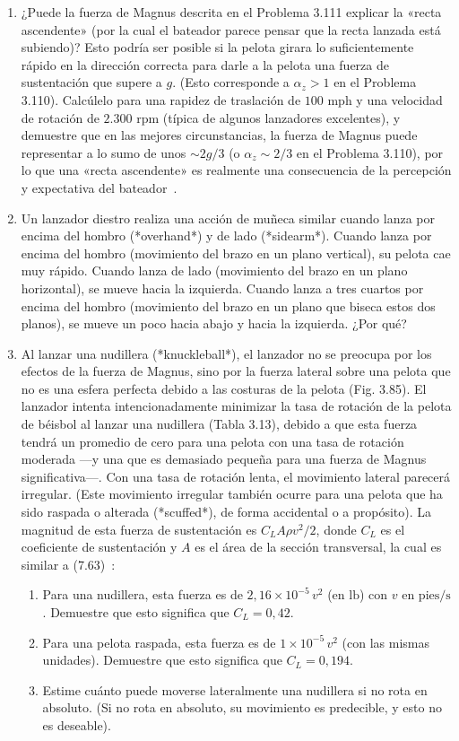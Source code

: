 \documentclass[12pt]{book}
\begin{document}
\begin{enumerate}
\item[3.112] ¿Puede la fuerza de Magnus descrita en el Problema 3.111 explicar la «recta ascendente» (por la cual el bateador parece pensar que la recta lanzada está subiendo)? Esto podría ser posible si la pelota girara lo suficientemente rápido en la dirección correcta para darle a la pelota una fuerza de sustentación que supere a $g$. (Esto corresponde a $\alpha_z > 1$ en el Problema 3.110). Calcúlelo para una rapidez de traslación de $100\text{ mph}$ y una velocidad de rotación de $2.300\text{ rpm}$ (típica de algunos lanzadores excelentes), y demuestre que en las mejores circunstancias, la fuerza de Magnus puede representar a lo sumo de unos $\sim 2g/3$ (o $\alpha_z \sim 2/3$ en el Problema 3.110), por lo que una «recta ascendente» es realmente una consecuencia de la percepción y expectativa del bateador~\cite{ref9,ref137}.

\item[3.113] Un lanzador diestro realiza una acción de muñeca similar cuando lanza por encima del hombro (*overhand*) y de lado (*sidearm*). Cuando lanza por encima del hombro (movimiento del brazo en un plano vertical), su pelota cae muy rápido. Cuando lanza de lado (movimiento del brazo en un plano horizontal), se mueve hacia la izquierda. Cuando lanza a tres cuartos por encima del hombro (movimiento del brazo en un plano que biseca estos dos planos), se mueve un poco hacia abajo y hacia la izquierda. ¿Por qué?

\item[3.114] Al lanzar una nudillera (*knuckleball*), el lanzador no se preocupa por los efectos de la fuerza de Magnus, sino por la fuerza lateral sobre una pelota que no es una esfera perfecta debido a las costuras de la pelota (Fig. 3.85). El lanzador intenta intencionadamente minimizar la tasa de rotación de la pelota de béisbol al lanzar una nudillera (Tabla 3.13), debido a que esta fuerza tendrá un promedio de cero para una pelota con una tasa de rotación moderada ---y una que es demasiado pequeña para una fuerza de Magnus significativa---. Con una tasa de rotación lenta, el movimiento lateral parecerá irregular. (Este movimiento irregular también ocurre para una pelota que ha sido raspada o alterada (*scuffed*), de forma accidental o a propósito). La magnitud de esta fuerza de sustentación es $C_L A \rho v^2 / 2$, donde $C_L$ es el coeficiente de sustentación y $A$ es el área de la sección transversal, la cual es similar a (7.63)~\cite{ref137}:
\begin{enumerate}
\item[(a)] Para una nudillera, esta fuerza es de $2{,}16 \times 10^{-5}\, v^2$ (en $\text{lb}$) con $v$ en $\text{pies/s}$. Demuestre que esto significa que $C_L = 0{,}42$.
\item[(b)] Para una pelota raspada, esta fuerza es de $1 \times 10^{-5}\, v^2$ (con las mismas unidades). Demuestre que esto significa que $C_L = 0{,}194$.
\item[(c)] Estime cuánto puede moverse lateralmente una nudillera si no rota en absoluto. (Si no rota en absoluto, su movimiento es predecible, y esto no es deseable).
\end{enumerate}


\end{enumerate}
\end{document}
